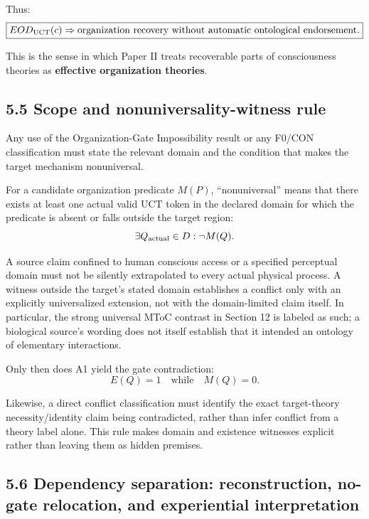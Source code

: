 \documentclass[
  11pt,
  a4paper,
]{article}
\begin{document}
Thus:
\nopagebreak[4]
\[
\boxed{
EOD_{\rm UCT}(c)
\Rightarrow
\text{organization recovery without automatic ontological endorsement}.
}
\]

This is the sense in which Paper II treats recoverable parts of
consciousness theories as \textbf{effective organization theories}.

\hypertarget{scope-and-nonuniversality-witness-rule}{%
\subsection{5.5 Scope and nonuniversality-witness
rule}\label{scope-and-nonuniversality-witness-rule}}

Any use of the Organization-Gate Impossibility result or any F0/CON
classification must state the relevant domain and the condition that
makes the target mechanism nonuniversal.

For a candidate organization predicate \(M(P)\), ``nonuniversal'' means
that there exists at least one actual valid UCT token in the declared
domain for which the predicate is absent or falls outside the target
region:
\nopagebreak[4]
\[
\exists Q_{\rm actual}\in D:
\neg M(Q).
\]

A source claim confined to human conscious access or a specified
perceptual domain must not be silently extrapolated to every actual
physical process. A witness outside the target's stated domain
establishes a conflict only with an explicitly universalized extension,
not with the domain-limited claim itself. In particular, the strong
universal MToC contrast in Section 12 is labeled as such; a biological
source's wording does not itself establish that it intended an ontology
of elementary interactions.

Only then does A1 yield the gate contradiction:
\nopagebreak[4]
\[
E(Q)=1
\quad\text{while}\quad
M(Q)=0.
\]

Likewise, a direct conflict classification must identify the exact
target-theory necessity/identity claim being contradicted, rather than
infer conflict from a theory label alone. This rule makes domain and
existence witnesses explicit rather than leaving them as hidden
premises.

\hypertarget{dependency-separation-reconstruction-no-gate-relocation-and-experiential-interpretation}{%
\subsection{5.6 Dependency separation: reconstruction, no-gate
relocation, and experiential
interpretation}\label{dependency-separation-reconstruction-no-gate-relocation-and-experiential-interpretation}}
\end{document}
